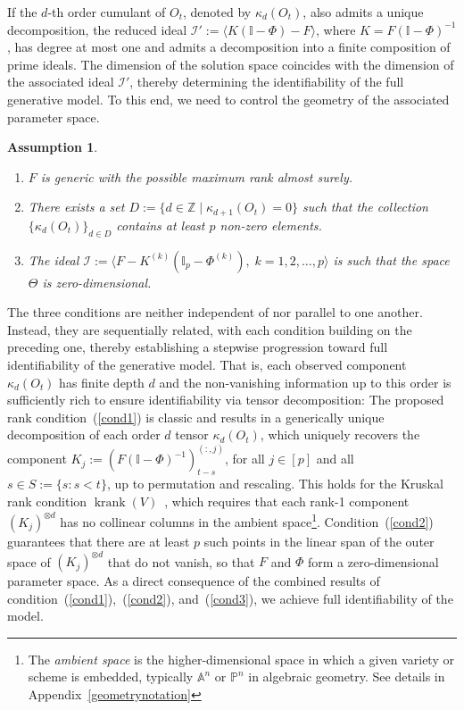\documentclass[10pt]{article}
\numberwithin{figure}{section}
\newtheorem{assumption}{Assumption}
\begin{document}
If the $d$-th order cumulant of $O_t$, denoted by $\kappa_d(O_t)$, also admits a unique decomposition, the reduced ideal $\mathcal{I}':=\langle K(\mathbb{I}-\Phi)-F\rangle$, where $K= F(\mathbb{I}-\Phi)^{-1}$, has degree at most one and admits a decomposition into a finite composition of prime ideals. The dimension of the solution space coincides with the dimension of the associated ideal $\mathcal{I}'$, thereby determining the identifiability of the full generative model. To this end, we need to control the geometry of the associated parameter space.  \textcolor{blue}{}
\begin{assumption}\label{Linear_idf_Assmption}
\leavevmode
    \begin{enumerate}
        \item \label{cond1}$F$ is generic with the possible maximum rank almost surely.
    \item \label{cond2} There exists a set $D := \{ d \in \mathbb{Z} \mid \kappa_{d+1}(O_t) = 0 \}$ such that the collection $\{ \kappa_d(O_t) \}_{d \in D}$ contains at least $p$ non-zero elements.

    \item \label{cond3} The ideal $\mathcal{I} := \langle F - K^{(k)} (\mathbb{I}_{p} - \Phi^{(k)}),\; k=1,2,\dots,p \rangle$ is such that the space $\Theta$ is zero-dimensional.
    \end{enumerate}
\end{assumption}
The three conditions are neither independent of nor parallel to one another. Instead, they are sequentially related, with each condition building on the preceding one, thereby establishing a stepwise progression toward full identifiability of the generative model.  That is, each observed component $\kappa_d(O_t)$ has finite depth $d$ and the non-vanishing information up to this order is sufficiently rich to ensure identifiability via tensor decomposition: The proposed rank condition~(\ref{cond1}) is classic and results in a generically unique decomposition of each order $d$ tensor $\kappa_d (O_t)$, which uniquely recovers the component $K_j:= (F(\mathbb{I}-\Phi)^{-1})_{t-s}^{(:,j)} $, for all $j\in [p]$ and all $s\in S:=\{s:s<t\}$, up to permutation and rescaling. This holds for the Kruskal rank condition $\operatorname{krank}(V)$~\citep{kruskal1977three,lovitz2023generalization}, which requires that each rank-1 component $\left(K_j\right)^{\otimes d}$ has no collinear columns in the ambient space\footnote{The \emph{ambient space} is the higher-dimensional space in which a given variety or scheme is embedded, typically $\mathbb{A}^n$ or $\mathbb{P}^n$ in algebraic geometry. See details in Appendix~\ref{geometrynotation}}\citep{wang_identifiability_2024,wang_contrastive_2025}. Condition~(\ref{cond2}) guarantees that there are at least $p$ such points in the linear span of the outer space of $\left(K_j\right)^{\otimes d}$ that do not vanish, so that $F$ and $\Phi$ form a zero-dimensional parameter space. As a direct consequence of the combined results of condition~(\ref{cond1}),~(\ref{cond2}), and~(\ref{cond3}), we achieve full identifiability of the model.
\end{document}
